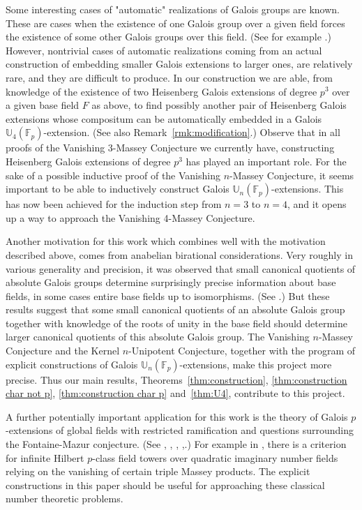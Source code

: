 \documentclass[12pt,leqno]{amsart}
\theoremstyle{plain}
\theoremstyle{definition}
\newcommand{\F}{{\mathbb F}}
\newcommand{\U}{{\mathbb U}}
\begin{document}
Some interesting cases of  "automatic" realizations of Galois groups  are known. These are  cases  when the existence of one Galois group over a given field forces the existence of some other Galois groups over this field.  (See for example \cite{Je, MS,MSS, MZ, Wh}.) However, nontrivial cases of automatic realizations coming from an actual construction of embedding  smaller Galois extensions to larger ones, are relatively rare, and they are difficult to produce. 
In our construction we are able,  from  knowledge of the existence of two Heisenberg Galois extensions of degree $p^3$ over a given base field $F$ as above, to find possibly another pair of Heisenberg Galois extensions whose compositum can be automatically embedded in a Galois $\U_4(\F_p)$-extension. (See also Remark~\ref{rmk:modification}.)
Observe that in all proofs of the Vanishing 3-Massey Conjecture we currently have, constructing Heisenberg Galois extensions of degree $p^3$ has  played an important role. For the sake of a possible inductive proof of the Vanishing $n$-Massey Conjecture, it seems  important to be able to  inductively construct Galois $\U_n(\F_p)$-extensions. This  has now been achieved for the induction step from $n=3$ to $n=4$, and it opens up a way to approach the Vanishing 4-Massey Conjecture. 

Another motivation for this work which combines well with the motivation described above, comes from anabelian birational considerations. Very roughly in various generality and precision, it was observed that small canonical quotients of absolute Galois groups determine surprisingly precise information about  base fields, in some cases  entire base fields up to isomorphisms. (See \cite{BT1,BT2,CEM,EM1,EM2,MSp,Pop}.) 
But these results suggest that some small canonical quotients of an absolute Galois group together with  knowledge of the roots of unity in the base field should determine larger canonical quotients of this absolute Galois group.
The Vanishing $n$-Massey Conjecture and the  Kernel $n$-Unipotent Conjecture, together with the program of explicit constructions of Galois $\U_n(\F_p)$-extensions, make this project more precise. Thus our main results, Theorems~\ref{thm:construction}, \ref{thm:construction char not p}, \ref{thm:construction char p} and~\ref{thm:U4}, contribute to this project.

A further potentially important application for this work is the theory of Galois $p$-extensions of global fields with restricted ramification and questions surrounding the Fontaine-Mazur conjecture. (See \cite{Ko}, \cite{La}, 
\cite{McL}, \cite{Ga},\cite{Se2}.) For example in \cite[Section 3]{McL}, there is a criterion for infinite Hilbert $p$-class field towers over quadratic imaginary number fields relying on the vanishing of certain triple Massey products. The explicit constructions in this paper should be useful for approaching  these classical number theoretic problems. 
\end{document}
